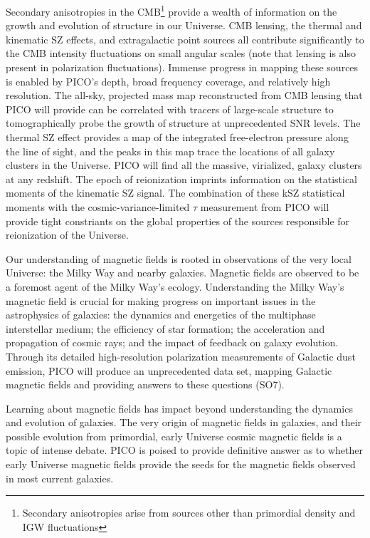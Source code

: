 \documentclass[PICOReport.tex]{subfiles}
\begin{document}
Secondary anisotropies in the CMB\footnote{Secondary anisotropies arise from sources other than primordial density and \ac{IGW} fluctuations} provide a wealth of information on the growth and evolution of structure in our Universe. CMB lensing, the thermal and kinematic \ac{SZ} effects, and extragalactic point sources all contribute significantly to the CMB intensity fluctuations on small angular scales (note that lensing is also present in polarization fluctuations). Immense progress in mapping these sources is enabled by PICO's depth, broad frequency coverage, and relatively high resolution. The all-sky, projected mass map reconstructed from CMB lensing that PICO will provide can be correlated with tracers of large-scale structure to tomographically probe the growth of structure at unprecedented \ac{SNR} levels. The thermal SZ effect provides a map of the integrated free-electron pressure along the line of sight, and the peaks in this map trace the locations of all galaxy clusters in the Universe. PICO will find all the massive, virialized, galaxy clusters at any redshift.  The epoch of reionization imprints information on the statistical moments of the kinematic SZ signal. The combination of these kSZ statistical moments with the cosmic-variance-limited $\tau$ measurement from PICO will provide tight constriants on the global properties of the sources responsible for reionization of the Universe.

Our understanding of magnetic fields is rooted in observations of the very local Universe: the Milky Way and nearby galaxies. Magnetic fields are observed to be a foremost agent of the Milky Way's ecology. Understanding the Milky Way's magnetic field is crucial for making progress on important issues in the astrophysics of galaxies: the dynamics and energetics of the multiphase interstellar medium; the efficiency of star formation; the acceleration and propagation of cosmic rays; and the impact of feedback on galaxy evolution. Through its detailed high-resolution polarization measurements of Galactic dust emission, PICO will produce an unprecedented data set, mapping Galactic magnetic fields and providing answers to these questions (SO7). 

Learning about magnetic fields has impact beyond understanding the dynamics and evolution of galaxies. The very origin of magnetic fields in galaxies, and their possible evolution from primordial, early Universe cosmic magnetic fields is a topic of intense debate. PICO is poised to provide definitive answer as to whether early Universe magnetic fields provide the seeds for the magnetic fields observed in most current galaxies. 
\end{document}
